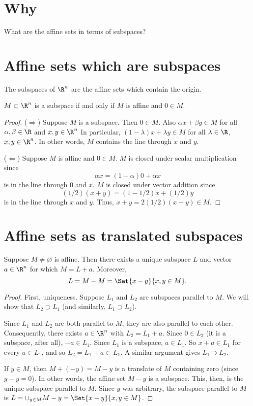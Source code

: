 
\section*{Why}

What are the affine sets in terms of subspaces?

\section*{Affine sets which are subspaces}

The subspaces of $\R ^n$ are the affine sets which contain the origin.

\begin{proposition}$M \subset \R ^n$ is a subspace if and only if $M$ is affine and $0 \in M$.
\begin{proof}
($\Rightarrow$)
Suppose $M$ is a subspace.
Then $0 \in M$.
Also $\alpha x + \beta y \in M$ for all $\alpha , \beta  \in \R $ and $x, y \in \R ^n$
In particular, $(1- \lambda )x + \lambda y \in M$ for all $\lambda  \in \R $, $x, y \in \R ^n$.
In other words, $M$ contains the line through $x$ and $y$.

($\Leftarrow$) Suppose $M$ is affine and $0 \in M$.
$M$ is closed under scalar multiplication since
\[
\alpha x = (1 - \alpha )0 + \alpha x
\]
is in the line through $0$ and $x$.
$M$ is closed under vector addition since
\[
(1/2)(x + y) = (1-1/2)x + (1/2)y
\]
is in the line through $x$ and $y$.
Thus, $x+y = 2(1/2)(x+y) \in M$.\end{proof}\end{proposition}
\section*{Affine sets as translated subspaces}

\begin{proposition}Suppose $M \neq \varnothing$ is affine.
Then there exists a unique subspace $L$ and vector $a \in \R ^n$ for which $M = L + a$.
Moreover,
\[
L = M - M = \Set{x - y}{x,y \in M}.
\]\end{proposition}
\begin{proof}First, uniqueness.
Suppose $L_1$ and $L_2$ are subspaces parallel to $M$.
We will show that $L_2 \supset L_1$ (and similarly, $L_1 \supset L_2$).

Since $L_1$ and $L_2$ are both parallel to $M$, they are also parallel to each other.
Consequently, there exists $a \in \R ^n$ with $L_2 = L_1 + a$.
Since $0 \in L_2$ (it is a subspace, after all), $-a \in L_1$.
Since $L_1$ is a subspace, $a \in L_1$.
So $x + a \in L_1$ for every $a \in L_1$, and so $L_2 = L_1 + a \subset L_1$.
A similar argument gives $L_1 \supset L_2$.

If $y \in M$, then $M + (-y) = M - y$ is a translate of $M$ containing zero (since $y - y = 0$).
In other words, the affine set $M - y$ is a subspace.
This, then, is the unique subspace parallel to $M$.
Since $y$ was arbitrary, the subspace parallel to $M$ is $L = \cup_{y \in M} M - y = \Set{x - y}{x,y \in M}$.\end{proof}